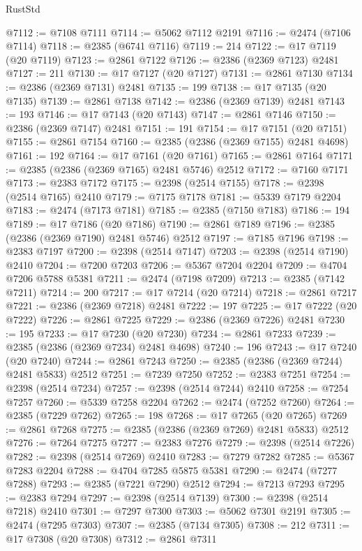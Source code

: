 \begin{lexlean}{RustStd}
\begin{coremodule}
{\begin{coremodule}
{{{{{{{{{{{{{{{{{{{{{{{{{{{{{{{{{{{{{{{{{{{{{{{{{{@7112 := @7108 @7111
@7114 := @5062 @7112 @2191
@7116 := @2474 (@7106 @7114)
@7118 := @2385 (@6741 @7116)
@7119 := 214
@7122 := @17 @7119 (@20 @7119)
@7123 := @2861 @7122
@7126 := @2386 (@2369 @7123) @2481
@7127 := 211
@7130 := @17 @7127 (@20 @7127)
@7131 := @2861 @7130
@7134 := @2386 (@2369 @7131) @2481
@7135 := 199
@7138 := @17 @7135 (@20 @7135)
@7139 := @2861 @7138
@7142 := @2386 (@2369 @7139) @2481
@7143 := 193
@7146 := @17 @7143 (@20 @7143)
@7147 := @2861 @7146
@7150 := @2386 (@2369 @7147) @2481
@7151 := 191
@7154 := @17 @7151 (@20 @7151)
@7155 := @2861 @7154
@7160 := @2385 (@2386 (@2369 @7155) @2481 @4698)
@7161 := 192
@7164 := @17 @7161 (@20 @7161)
@7165 := @2861 @7164
@7171 := @2385 (@2386 (@2369 @7165) @2481 @5746) @2512
@7172 := @7160 @7171
@7173 := @2383 @7172
@7175 := @2398 (@2514 @7155)
@7178 := @2398 (@2514 @7165) @2410
@7179 := @7175 @7178
@7181 := @5339 @7179 @2204
@7183 := @2474 (@7173 @7181)
@7185 := @2385 (@7150 @7183)
@7186 := 194
@7189 := @17 @7186 (@20 @7186)
@7190 := @2861 @7189
@7196 := @2385 (@2386 (@2369 @7190) @2481 @5746) @2512
@7197 := @7185 @7196
@7198 := @2383 @7197
@7200 := @2398 (@2514 @7147)
@7203 := @2398 (@2514 @7190) @2410
@7204 := @7200 @7203
@7206 := @5367 @7204 @2204
@7209 := @4704 @7206 @5788 @5381
@7211 := @2474 (@7198 @7209)
@7213 := @2385 (@7142 @7211)
@7214 := 200
@7217 := @17 @7214 (@20 @7214)
@7218 := @2861 @7217
@7221 := @2386 (@2369 @7218) @2481
@7222 := 197
@7225 := @17 @7222 (@20 @7222)
@7226 := @2861 @7225
@7229 := @2386 (@2369 @7226) @2481
@7230 := 195
@7233 := @17 @7230 (@20 @7230)
@7234 := @2861 @7233
@7239 := @2385 (@2386 (@2369 @7234) @2481 @4698)
@7240 := 196
@7243 := @17 @7240 (@20 @7240)
@7244 := @2861 @7243
@7250 := @2385 (@2386 (@2369 @7244) @2481 @5833) @2512
@7251 := @7239 @7250
@7252 := @2383 @7251
@7254 := @2398 (@2514 @7234)
@7257 := @2398 (@2514 @7244) @2410
@7258 := @7254 @7257
@7260 := @5339 @7258 @2204
@7262 := @2474 (@7252 @7260)
@7264 := @2385 (@7229 @7262)
@7265 := 198
@7268 := @17 @7265 (@20 @7265)
@7269 := @2861 @7268
@7275 := @2385 (@2386 (@2369 @7269) @2481 @5833) @2512
@7276 := @7264 @7275
@7277 := @2383 @7276
@7279 := @2398 (@2514 @7226)
@7282 := @2398 (@2514 @7269) @2410
@7283 := @7279 @7282
@7285 := @5367 @7283 @2204
@7288 := @4704 @7285 @5875 @5381
@7290 := @2474 (@7277 @7288)
@7293 := @2385 (@7221 @7290) @2512
@7294 := @7213 @7293
@7295 := @2383 @7294
@7297 := @2398 (@2514 @7139)
@7300 := @2398 (@2514 @7218) @2410
@7301 := @7297 @7300
@7303 := @5062 @7301 @2191
@7305 := @2474 (@7295 @7303)
@7307 := @2385 (@7134 @7305)
@7308 := 212
@7311 := @17 @7308 (@20 @7308)
@7312 := @2861 @7311
}}}}}}}}}}}}}}}}}}}}}}}}}}}}}}}}}}}}}}}}}}}}}}}}}}
\end{coremodule}}
\end{coremodule}
\end{lexlean}
